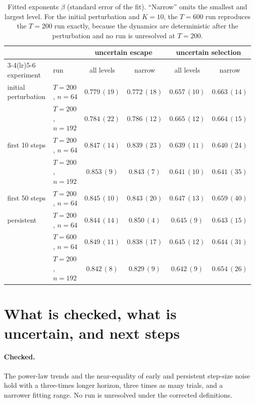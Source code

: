 \documentclass[11pt]{article}
\begin{document}
\begin{table}[!htbp]
  \centering
  \caption{Fitted exponents $\beta$ (standard error of the fit). ``Narrow'' omits the smallest and largest level. For the initial perturbation and $K=10$, the $T=600$ run reproduces the $T=200$ run exactly, because the dynamics are deterministic after the perturbation and no run is unresolved at $T=200$.}
  \label{tab:exponents}
  \small
  \begin{tabular}{llcccc}
    \toprule
    & & \multicolumn{2}{c}{uncertain escape} & \multicolumn{2}{c}{uncertain selection} \\
    \cmidrule(lr){3-4}\cmidrule(lr){5-6}
    experiment & run & all levels & narrow & all levels & narrow \\
    \midrule
    initial perturbation & $T=200$, $n=64$  & $0.779\,(19)$ & $0.772\,(18)$ & $0.657\,(10)$ & $0.663\,(14)$ \\
                         & $T=200$, $n=192$ & $0.784\,(22)$ & $0.786\,(12)$ & $0.665\,(12)$ & $0.664\,(15)$ \\
    first 10 steps       & $T=200$, $n=64$  & $0.847\,(14)$ & $0.839\,(23)$ & $0.639\,(11)$ & $0.640\,(24)$ \\
                         & $T=200$, $n=192$ & $0.853\,(9)$  & $0.843\,(7)$  & $0.641\,(10)$ & $0.641\,(35)$ \\
    first 50 steps       & $T=200$, $n=64$  & $0.845\,(10)$ & $0.843\,(20)$ & $0.647\,(13)$ & $0.659\,(40)$ \\
    persistent           & $T=200$, $n=64$  & $0.844\,(14)$ & $0.850\,(4)$  & $0.645\,(9)$  & $0.643\,(15)$ \\
                         & $T=600$, $n=64$  & $0.849\,(11)$ & $0.838\,(17)$ & $0.645\,(12)$ & $0.644\,(31)$ \\
                         & $T=200$, $n=192$ & $0.842\,(8)$  & $0.829\,(9)$  & $0.642\,(9)$  & $0.654\,(26)$ \\
    \bottomrule
  \end{tabular}
\end{table}

\section{What is checked, what is uncertain, and next steps}

\paragraph{Checked.} The power-law trends and the near-equality of early and persistent step-size noise hold with a three-times longer horizon, three times as many trials, and a narrower fitting range. No run is unresolved under the corrected definitions.
\end{document}

